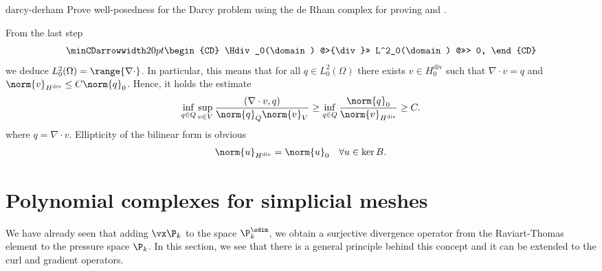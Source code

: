 \begin{Problem}{darcy-derham}
  Prove well-posedness for the Darcy problem using the de Rham complex
  for proving  and
  .
\begin{solution}
From the last step
 \begin{gather}\minCDarrowwidth20pt
    \begin{CD}
      \Hdiv_0(\domain)
      @>{\div}>> L^2_0(\domain)
      @>>> 0,
    \end{CD}
  \end{gather}
we deduce $L_0^2(\Omega)=\range{\nabla\cdot}$. In particular, this means
that for all $q\in L_0^2(\Omega)$ there exists $v\in H_0^{\text{div}}$ such that
$\nabla \cdot v=q$ and $\norm{v}_{H^{\text{div}}}\leq C \norm{q}_0$.
Hence, it holds the estimate
\begin{align}
\inf_{q\in Q}\sup_{v\in V}\frac{(\nabla \cdot v, q)}{\norm{q}_Q\norm{v}_V}
  \geq \inf_{q\in Q} \frac{\norm{q}_0}{\norm{v}_{H^{\text{div}}}}\geq C.
\end{align}
where $q = \nabla \cdot v$. Ellipticity of the bilinear form is obvious
\begin{align}
  \norm{u}_{H^{\text{div}}}=\norm{u}_0 \quad \forall u\in \ker B.
\end{align}
\end{solution}
\end{Problem}

\section{Polynomial complexes for simplicial meshes}

\begin{intro}
  We have already seen that adding $\vx\P_k$ to the space $\P_k^\sdim$, we
  obtain a surjective divergence operator from the Raviart-Thomas
  element to the pressure space $\P_k$. In this section, we see that
  there is a general principle behind this concept and it can be
  extended to the curl and gradient operators.
\end{intro}

